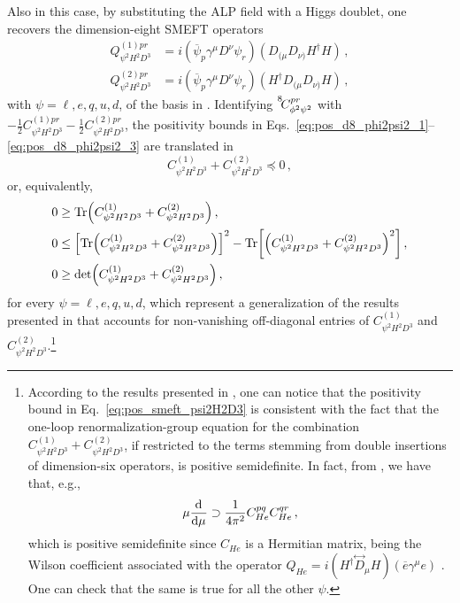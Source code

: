 Also in this case, by substituting the ALP field with a Higgs doublet, one recovers the dimension-eight SMEFT operators 
\begin{align}
    Q_{\psi^2 H^2 D^3}^{(1)pr} &= i(\overline \psi_p \gamma^\mu D^\nu \psi_r)(D_{(\mu}D_{\nu)} H^\dagger H)\,,
    \\
    Q_{\psi^2 H^2 D^3}^{(2)pr} &= i(\overline \psi_p \gamma^\mu D^\nu \psi_r)(H^\dagger D_{(\mu}D_{\nu)}H)\,,
\end{align}
with $\psi = \ell,e,q,u,d$, of the basis in \cite{Murphy:2020rsh}.
Identifying $\coef{8}{\phi^2\psi^2}{pr}$ with $-\frac{1}{2}C_{\psi^2 H^2 D^3}^{(1)pr}-\frac{1}{2}C_{\psi^2 H^2 D^3}^{(2)pr}$, the positivity bounds in Eqs.~\eqref{eq:pos_d8_phi2psi2_1}--\eqref{eq:pos_d8_phi2psi2_3} are translated in
\begin{equation}\label{eq:pos_smeft_psi2H2D3}
    C^{(1)}_{\psi^2 H^2 D^3} + C^{(2)}_{\psi^2 H^2 D^3} \preceq 0\,,
\end{equation}
or, equivalently,
\begin{align}
    0 &\ge \Tr(C_{\psi^2 H^2 D^3}^{(1)}+C_{\psi^2 H^2 D^3}^{(2)})\,,\\
    0 &\le \left[\Tr(C_{\psi^2 H^2 D^3}^{(1)}+C_{\psi^2 H^2 D^3}^{(2)})\right]^2  - \Tr[\left(C_{\psi^2 H^2 D^3}^{(1)}+C_{\psi^2 H^2 D^3}^{(2)}\right)^2]\,,\\
    0 &\ge\det(C_{\psi^2 H^2 D^3}^{(1)}+C_{\psi^2 H^2 D^3}^{(2)})\,,
\end{align}
for every $\psi = \ell,e,q,u,d$,
which represent a generalization of the results presented in \cite{Chala:2023xjy} that accounts for non-vanishing off-diagonal entries of $C_{\psi^2 H^2 D^3}^{(1)}$ and $C_{\psi^2 H^2 D^3}^{(2)}$.\footnote{According to the results presented in \cite{Chala:2021wpj,Chala:2023jyx,Chala:2023xjy,Liao:2025npz}, one can notice that the positivity bound in Eq.~\eqref{eq:pos_smeft_psi2H2D3} is consistent with the fact that the one-loop renormalization-group equation for the combination $C_{\psi^2 H^2 D^3}^{(1)}+C_{\psi^2 H^2 D^3}^{(2)}$, if restricted to the terms stemming from double insertions of dimension-six operators, is positive semidefinite. In fact, from \cite{Bakshi:2024wzz}, we have that, e.g.,
\begin{equation}
    \mu\dv[]{}{\mu}(C_{e^2 H^2 D^3}^{(1)pr}+C_{e^2 H^2 D^3}^{(2)pr}) \supset \frac{1}{4\pi^2} C_{He}^{pq}C_{He}^{qr}\,,
\end{equation}
which is positive semidefinite since $C_{He}$ is a Hermitian matrix, being the Wilson coefficient associated with the operator $Q_{He} = i(H^\dagger \overset{\leftrightarrow}{D}_\mu H)(\overline e \gamma^\mu e)$ \cite{Grzadkowski:2010es}. One can check that the same is true for all the other $\psi$.}

